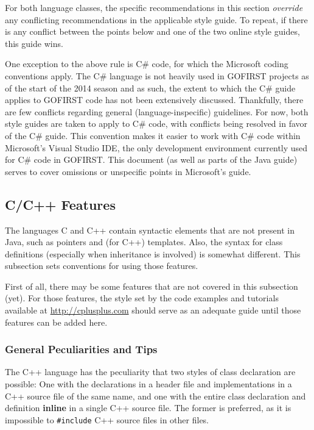 \documentclass[12pt]{article}
\newcommand{\code}[1]{\texttt{#1}}
\newcommand{\textdef}[1]{\textbf{#1}}
\begin{document}
For both language classes, the specific recommendations in this section \emph{override} any conflicting recommendations in the applicable style guide. To repeat, if there is any conflict between the points below and one of the two online style guides, this guide wins.

One exception to the above rule is C\# code, for which the Microsoft coding conventions \cite{csguide} apply. The C\# language is not heavily used in GOFIRST projects as of the start of the 2014 season and as such, the extent to which the C\# guide applies to GOFIRST code has not been extensively discussed. Thankfully, there are few conflicts regarding general (language-inspecific) guidelines. For now, both style guides are taken to apply to C\# code, with conflicts being resolved in favor of the C\# guide. This convention makes it easier to work with C\# code within Microsoft's Visual Studio IDE, the only development environment currently used for C\# code in GOFIRST. This document (as well as parts of the Java guide) serves to cover omissions or unspecific points in Microsoft's guide.

\subsection{C/C++ Features}
\label{sec:ccpp-special}
The languages C and C++ contain syntactic elements that are not present in Java, such as pointers and (for C++) templates. Also, the syntax for class definitions (especially when inheritance is involved) is somewhat different. This subsection sets conventions for using those features.

First of all, there may be some features that are not covered in this subsection (yet). For those features, the style set by the code examples and tutorials available at \url{http://cplusplus.com} should serve as an adequate guide until those features can be added here.

\subsubsection{General Peculiarities and Tips}
The C++ language has the peculiarity that two styles of class declaration are possible: One with the declarations in a header file and implementations in a C++ source file of the same name, and one with the entire class declaration and definition \textdef{inline} in a single C++ source file. The former is preferred, as it is impossible to \code{\#include} C++ source files in other files.
\end{document}
